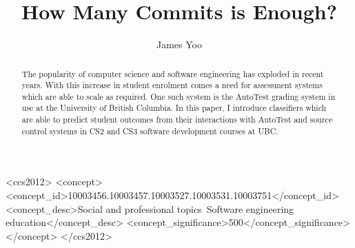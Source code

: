 \documentclass[sigchi]{acmart}
\begin{document}
\title{How Many Commits is Enough?}

\author{James Yoo}



\begin{abstract}
The popularity of computer science and software engineering has exploded in recent years. With this increase in student enrolment comes a need for assessment systems which are able to scale as required. One such system is the AutoTest grading system in use at the University of British Columbia. In this paper, I introduce classifiers which are able to predict student outcomes from their interactions with AutoTest and source control systems in CS2 and CS3 software development courses at UBC.
\end{abstract}

\begin{CCSXML}
<ccs2012>
<concept>
<concept_id>10003456.10003457.10003527.10003531.10003751</concept_id>
<concept_desc>Social and professional topics~Software engineering education</concept_desc>
<concept_significance>500</concept_significance>
</concept>
</ccs2012>
\end{CCSXML}


\end{document}
